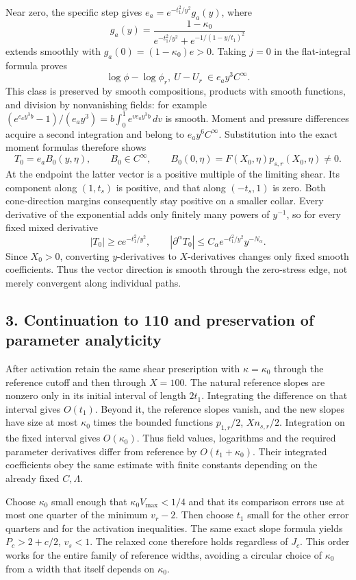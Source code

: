 \documentclass[10pt,a4paper]{article}
\begin{document}
Near zero, the specific step gives \(e_a=e^{-t_1^2/y^2}g_a(y)\), where
\[
g_a(y)=\frac{1-\kappa_0}{e^{-t_1^2/y^2}+e^{-1/(1-y/t_1)^2}}
\]
extends smoothly with \(g_a(0)=(1-\kappa_0)e>0\). Taking \(j=0\) in the flat-integral formula proves
\[
\log\phi-\log\phi_r,\ U-U_r\ \in e_ay^3C^\infty.
\]
This class is preserved by smooth compositions, products with smooth functions, and division by nonvanishing fields: for example \((e^{e_ay^3b}-1)/(e_ay^3)=b\int_0^1e^{ve_ay^3b}\,dv\) is smooth. Moment and pressure differences acquire a second integration and belong to \(e_ay^6C^\infty\). Substitution into the exact moment formulas therefore shows
\[
T_0=e_aB_0(y,\eta),\qquad
B_0\in C^\infty,\qquad
B_0(0,\eta)=F(X_0,\eta)p_{s,r}(X_0,\eta)\ne0.
\]
At the endpoint the latter vector is a positive multiple of the limiting shear. Its component along \((1,t_s)\) is positive, and that along \((-t_s,1)\) is zero. Both cone-direction margins consequently stay positive on a smaller collar. Every derivative of the exponential adds only finitely many powers of \(y^{-1}\), so for every fixed mixed derivative
\[
|T_0|\ge c e^{-t_1^2/y^2},\qquad
|\partial^\alpha T_0|\le C_\alpha e^{-t_1^2/y^2}y^{-N_\alpha}.
\]
Since \(X_0>0\), converting \(y\)-derivatives to \(X\)-derivatives changes only fixed smooth coefficients. Thus the vector direction is smooth through the zero-stress edge, not merely convergent along individual paths.

\subsection{3. Continuation to 110 and preservation of parameter analyticity}

After activation retain the same shear prescription with \(\kappa=\kappa_0\) through the reference cutoff and then through \(X=100\). The natural reference slopes are nonzero only in its initial interval of length \(2t_1\). Integrating the difference on that interval gives \(O(t_1)\). Beyond it, the reference slopes vanish, and the new slopes have size at most \(\kappa_0\) times the bounded functions \(p_{1,r}/2\), \(Xn_{s,r}/2\). Integration on the fixed interval gives \(O(\kappa_0)\). Thus field values, logarithms and the required parameter derivatives differ from reference by \(O(t_1+\kappa_0)\). Their integrated coefficients obey the same estimate with finite constants depending on the already fixed \(C,\Lambda\).

Choose \(\kappa_0\) small enough that \(\kappa_0V_{\max}<1/4\) and that its comparison errors use at most one quarter of the minimum \(v_r-2\). Then choose \(t_1\) small for the other error quarters and for the activation inequalities. The same exact slope formula yields \(P_c>2+c/2\), \(v_s<1\). The relaxed cone therefore holds regardless of \(J_c\). This order works for the entire family of reference widths, avoiding a circular choice of \(\kappa_0\) from a width that itself depends on \(\kappa_0\).
\end{document}
